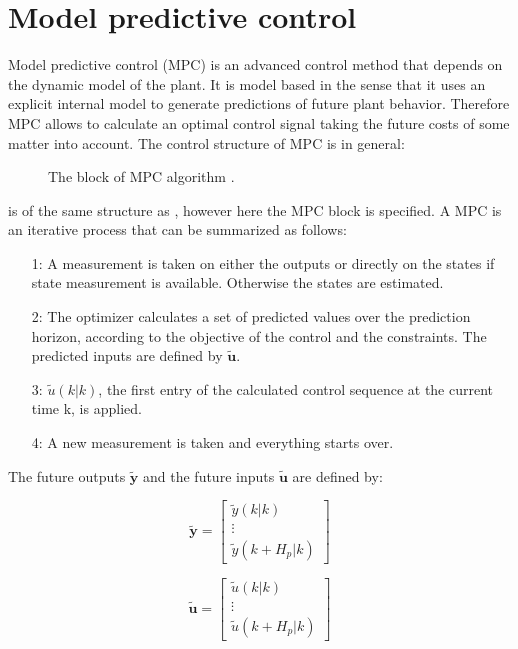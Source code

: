 \section{Model predictive control}
\label{sec:MPC}

Model predictive control (MPC) is an advanced control method that depends on the dynamic model of the plant. It is model based in the sense that it uses an explicit internal model to generate predictions of future plant behavior. Therefore MPC allows to calculate an optimal control signal taking the future costs of some matter into account. The control structure of MPC is in general:
\begin{figure}[H]
\centering
 
\caption{The block of MPC algorithm \cite{Camacho2007}.}
\label{mpc_structure}
\end{figure}

 is of the same structure as , however here the MPC block is specified. A MPC is an iterative process that can be summarized as follows: 

\begin{itemize}
\item[1:] A measurement is taken on either the outputs or directly on the states if state measurement is available. Otherwise the states are estimated. 
\item[2:] The optimizer calculates a set of predicted values over the prediction horizon, according to the objective of the control and the constraints. The predicted inputs are defined by $\bm{\tilde{u}}$.
\item[3:] $\tilde u(k|k)$, the first entry of the calculated control sequence at the current time k, is applied.
\item[4:] A new measurement is taken and everything starts over. 
\end{itemize}

The future outputs $\bm{\tilde y}$ and the future inputs $\bm{\tilde u}$ are defined by:

\begin{equation}
\bm{\tilde y} =  
 \begin{bmatrix}
  \tilde y(k|k)\\
  \vdots  \\
  \tilde y(k+H_p|k)   
 \end{bmatrix}
\end{equation}

\begin{equation}
\bm{\tilde u} =  
 \begin{bmatrix}
  \tilde u(k|k)\\
  \vdots  \\
  \tilde u(k+H_p|k)   
 \end{bmatrix}
\end{equation}

